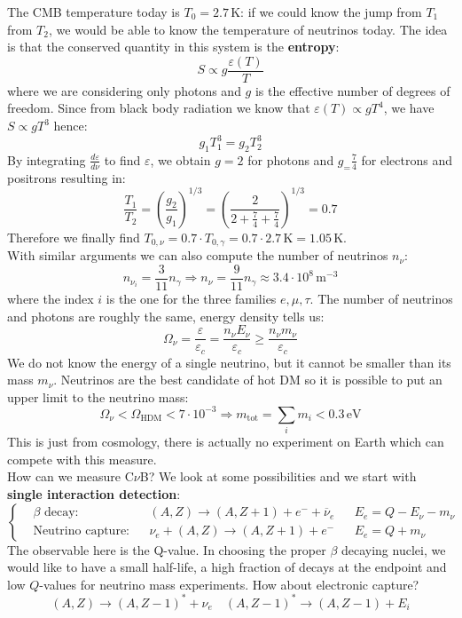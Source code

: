 \documentclass[10.75pt,a4paper,openright,bottom=2cm]{article}
\begin{document}
The CMB temperature today is $T_0=2.7$\,K: if we could know the jump from $T_1$ from $T_2$, we would be able to know the temperature of neutrinos today. The idea is that the conserved quantity in this system is the \textbf{entropy}:
\[
S\propto g\frac{\varepsilon(T)}{T}
\]
where we are considering only photons and $g$ is the effective number of degrees of freedom. Since from black body radiation we know that $\varepsilon(T)\propto gT^4$, we have $S\propto gT^3$ hence:
\[
g_1T_1^3=g_2T_2^3
\]
By integrating $\frac{d\varepsilon}{d\nu}$ to find $\varepsilon$, we obtain $g=2$ for photons and $g_=\frac{7}{4}$ for electrons and positrons  resulting in:
\[
\frac{T_1}{T_2}=\left(\frac{g_2}{g_1}\right)^{1/3}=\left(\frac{2}{2+\frac{7}{4}+\frac{7}{4}}\right)^{1/3}=0.7
\]
Therefore we finally find $T_{0,\nu}=0.7\cdot T_{0,\gamma}=0.7\cdot2.7$\,K$=1.05$\,K.\\
With similar arguments we can also compute the number of neutrinos $n_\nu$:
\[
n_{\nu_i}=\frac{3}{11}n_\gamma\Rightarrow n_\nu=\frac{9}{11}n_\gamma\approx3.4\cdot10^8\,\text{m$^{-3}$}
\]
where the index $i$ is the one for the three families $e,\mu,\tau$. The number of neutrinos and photons are roughly the same, energy density tells us:
\[
\Omega_\nu=\frac{\varepsilon}{\varepsilon_c}=\frac{n_\nu E_\nu}{\varepsilon_c}\ge\frac{n_\nu m_\nu}{\varepsilon_c}
\]
We do not know the energy of a single neutrino, but it cannot be smaller than its mass $m_\nu$. Neutrinos are the best candidate of hot DM so it is possible to put an upper limit to the neutrino mass:
\[
\Omega_\nu<\Omega_{\text{HDM}}<7\cdot10^{-3}\Rightarrow m_{\text{tot}}=\sum_im_i<0.3\,\text{eV}
\]
This is just from cosmology, there is actually no experiment on Earth which can compete with this measure.\\
How can we measure C$\nu$B? We look at some possibilities and we start with \textbf{single interaction detection}:
\[
\left\{
\begin{aligned}
&\text{$\beta$ decay}: &&(A,Z)\to(A,Z+1)+e^-+\overline{\nu}_e &&E_e=Q-E_\nu-m_\nu\\
&\text{Neutrino capture}: &&\nu_e+(A,Z)\to(A,Z+1)+e^- &&E_e=Q+m_\nu
\end{aligned}
\right.
\]
The observable here is the Q-value. In choosing the proper $\beta$ decaying nuclei, we would like to have a small half-life, a high fraction of decays at the endpoint and low $Q$-values for neutrino mass experiments. How about electronic capture?
\[
(A,Z)\to(A,Z-1)^*+\nu_e \quad (A,Z-1)^*\to(A,Z-1)+E_i
\]
\end{document}
